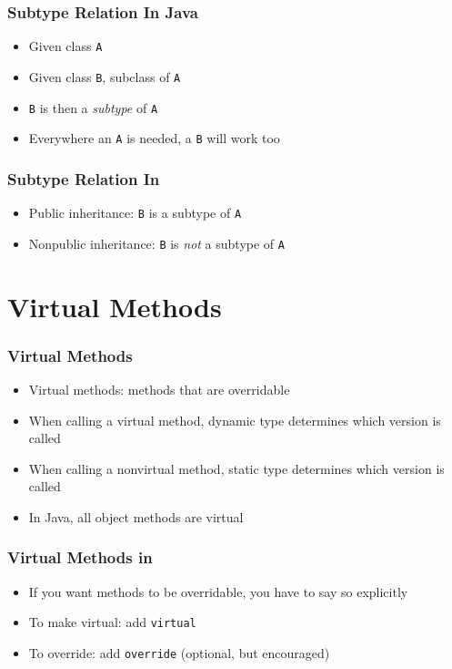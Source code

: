 \documentclass{../ucll-slides}
\begin{document}
\begin{frame}
  \frametitle{Subtype Relation In Java}
  \begin{itemize}
    \item Given class {\tt A}
    \item Given class {\tt B}, subclass of {\tt A}
    \item {\tt B} is then a \emph{subtype} of {\tt A}
    \item Everywhere an {\tt A} is needed, a {\tt B} will work too
  \end{itemize}
\end{frame}

\begin{frame}
  \frametitle{Subtype Relation In \cpp}
  \begin{itemize}
    \item Public inheritance: {\tt B} is a subtype of {\tt A}
    \item Nonpublic inheritance: {\tt B} is \emph{not} a subtype of {\tt A}
  \end{itemize}
\end{frame}

\section{Virtual Methods}

\begin{frame}
  \tableofcontents[currentsection]
\end{frame}

\begin{frame}
  \frametitle{Virtual Methods}
  \begin{itemize}
    \item Virtual methods: methods that are overridable
    \item When calling a virtual method, dynamic type determines which version is called
    \item When calling a nonvirtual method, static type determines which version is called
    \item In Java, all object methods are virtual
  \end{itemize}
\end{frame}

\begin{frame}
  \frametitle{Virtual Methods in \cpp}
  \begin{itemize}
    \item If you want methods to be overridable, you have to say so explicitly
    \item To make virtual: add {\tt virtual}
    \item To override: add {\tt override} (optional, but encouraged)
  \end{itemize}
  \vskip5mm
\end{frame}
\end{document}
